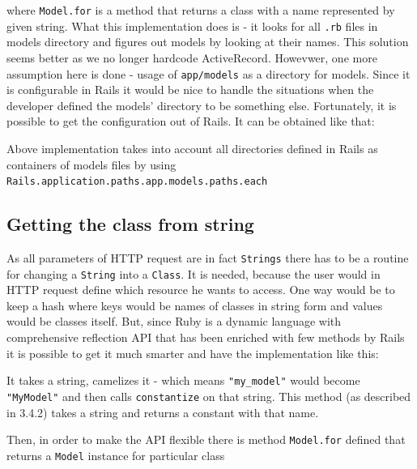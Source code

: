       
      
      where \texttt{Model.for} is a method that returns a class with a name represented by given string. What this implementation does is - it looks for all \texttt{.rb}
      files in models directory and figures out models by looking at their names. This solution seems better as we no longer hardcode ActiveRecord. Howevwer,
      one more assumption here is done - usage of \texttt{app/models} as a directory for models. Since it is configurable in Rails it would be nice to handle
      the situations when the developer defined the models' directory to be something else. Fortunately, it is possible to get the configuration out of Rails.
      It can be obtained like that:
      
      
      
      Above implementation takes into account all directories defined in Rails as containers of models files by using \texttt{Rails.application.paths.app.models.paths.each}
    \subsection{Getting the class from string}
      As all parameters of HTTP request are in fact \texttt{Strings} there has to be a routine for changing a \texttt{String} into a \texttt{Class}. It is needed, because
      the user would in HTTP request define which resource he wants to access. One way would be to keep a hash where keys would be names of classes in string form and 
      values would be classes itself. But, since Ruby is a dynamic language with comprehensive reflection API that has been enriched with few methods by Rails it is possible
      to get it much smarter and have the implementation like this:
      
      
      
      It takes a string, camelizes it - which means \texttt{"my\_model"} would become \texttt{"MyModel"} and then calls \texttt{constantize} on that string. This method 
      (as described in 3.4.2) takes a string and returns a constant with that name.
      
      Then, in order to make the API flexible there is method \texttt{Model.for} defined that returns a \texttt{Model} instance for particular class

      
      
